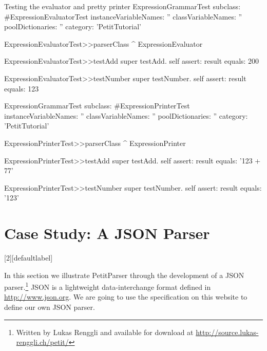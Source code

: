 \documentclass[a4paper,10pt,twoside]{book}
\begin{document}
\begin{script}{Testing the evaluator and pretty printer}
ExpressionGrammarTest subclass: #ExpressionEvaluatorTest
  instanceVariableNames: ''
  classVariableNames: ''
  poolDictionaries: ''
  category: 'PetitTutorial'

ExpressionEvaluatorTest>>parserClass
  ^ ExpressionEvaluator 

ExpressionEvaluatorTest>>testAdd
  super testAdd.
  self assert: result equals: 200

ExpressionEvaluatorTest>>testNumber
  super testNumber.
  self assert: result equals: 123

ExpressionGrammarTest subclass: #ExpressionPrinterTest
  instanceVariableNames: ''
  classVariableNames: ''
  poolDictionaries: ''
  category: 'PetitTutorial'

ExpressionPrinterTest>>parserClass
  ^ ExpressionPrinter 

ExpressionPrinterTest>>testAdd
  super testAdd.
  self assert: result equals: '123 + 77'

ExpressionPrinterTest>>testNumber
  super testNumber.
  self assert: result equals: '123'
\end{script}

\section{Case Study: A JSON Parser}

[2][defaultlabel]{%
\renewcommand{\lstlistingname}{Script}%
}{}
\newcommand{\syntaxjsonref}[1]{\figref{syntax-json-#1}}
\newcommand{\tikzgrammarjsonfig}[2]{%
  \begin{figure}
    \centering
    \tikzgrammar{#2}
    \caption{Syntax diagram representation for the JSON #1 parser defined in \scrref{json-#1}}
\label{fig:syntax-json-#1}
\end{figure}
}

In this section we illustrate PetitParser through the development of a
JSON parser.\footnote{Written by Lukas Renggli and available for
  download at \url{http://source.lukas-renggli.ch/petit/}} JSON is a
lightweight data-interchange format defined in
\url{http://www.json.org}. We are going to use the specification on
this website to define our own JSON parser.
\end{document}
